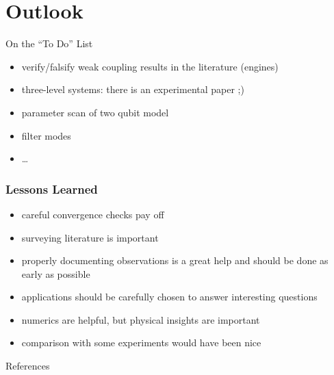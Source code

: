 \documentclass[10pt, aspectratio=169]{beamer}
\begin{document}
\section{Outlook}
\label{sec:outlook}
\begin{frame}{On the ``To Do'' List}
  \begin{itemize}
  \item verify/falsify weak coupling results in the literature
    (engines)
  \item three-level systems: there is an experimental paper ;)
  \item parameter scan of two qubit model
  \item filter modes
  \item \ldots
  \end{itemize}
\end{frame}

\begin{frame}
  \frametitle{Lessons Learned}
  \begin{itemize}
  \item careful convergence checks pay off
  \item surveying literature is important
  \item properly documenting observations is a great help
    and should be done as early as possible
  \item applications should be carefully chosen to answer interesting
    questions
  \item numerics are helpful, but physical insights are important
  \item comparison with some experiments would have been nice
  \end{itemize}
\end{frame}

\appendix
\begin{frame}[allowframebreaks]{References}
  \printbibliography
\end{frame}
\end{document}
